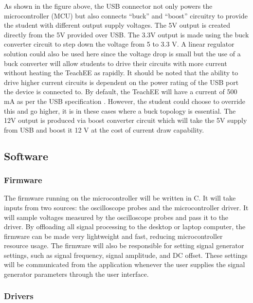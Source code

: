 \documentclass[letterpaper,12pt]{article}
\begin{document}
\noindent
As shown in the figure above, the USB connector not only powers the
microcontroller (MCU) but also connects ``buck'' and ``boost'' circuitry to
provide the student with different output supply voltages. The 5V output is
created directly from the 5V provided over USB. The 3.3V output is made using
the buck converter circuit to step down the voltage from 5 to 3.3 V. A linear
regulator solution could also be used here since the voltage drop is small but
the use of a buck converter will allow students to drive their circuits with
more current without heating the TeachEE as rapidly. It should be noted that the
ability to drive higher current circuits is dependent on the power rating of the
USB port the device is connected to. By default, the TeachEE will have a current
of 500 mA as per the USB specification \cite{kollman_powering_2002}. However,
the student could choose to override this and go higher, it is in these cases
where a buck topology is essential. The 12V output is produced via boost
converter circuit which will take the 5V supply from USB and boost it 12 V at
the cost of current draw capability.

\subsection{Software} %
\subsubsection{Firmware} %
The firmware running on the microcontroller will be written in C. It will take
inputs from two sources: the oscilloscope probes and the microcontroller driver.
It will sample voltages measured by the oscilloscope probes and pass it to the
driver. By offloading all signal processing to the desktop or laptop computer,
the firmware can be made very lightweight and fast, reducing microcontroller
resource usage. The firmware will also be responsible for setting signal
generator settings, such as signal frequency, signal amplitude, and DC offset.
These settings will be communicated from the application whenever the user
supplies the signal generator parameters through the user interface.

\subsubsection{Drivers} %
\end{document}
